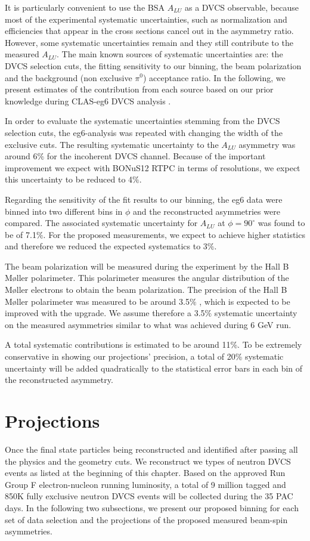 It is particularly convenient to use the BSA $A_{LU}$ as a DVCS observable, 
because most of the experimental systematic uncertainties, such as 
normalization and efficiencies that appear in the cross sections cancel out in 
the asymmetry ratio. However, some systematic uncertainties remain and they 
still contribute to the measured $A_{LU}$. The main known sources of systematic 
uncertainties are: the DVCS selection cuts, the fitting sensitivity to our 
binning, the beam polarization and the background (non exclusive $\pi^0$) 
acceptance ratio. In the following, we present estimates of the contribution 
from each source based on our prior knowledge during CLAS-eg6 DVCS analysis 
\cite{eg6_note}.

In order to evaluate the systematic uncertainties stemming from the DVCS 
selection cuts, the eg6-analysis was repeated with changing the width of the 
exclusive cuts. The resulting systematic uncertainty to the $A_{LU}$ asymmetry
was around 6$\%$ for the incoherent DVCS channel. Because of the important 
improvement we expect with BONuS12 RTPC in terms of resolutions, we expect this 
uncertainty to be reduced to 4$\%$.

Regarding the sensitivity of the fit results to our binning, the eg6 data were 
binned into two different bins in $\phi$ and the reconstructed asymmetries were 
compared. The associated systematic uncertainty for $A_{LU}$ at $\phi = 90 
^{\circ}$ was found to be of 7.1$\%$. For the proposed measurements, we expect 
to achieve higher statistics and therefore we reduced the expected systematics 
to 3$\%$.
   
The beam polarization will be measured during the experiment by the Hall B 
M\o{}ller polarimeter. This polarimeter measures the angular distribution of 
the M\o{}ller electrons to obtain the beam polarization. The precision of the 
Hall B M\o{}ller polarimeter was measured to be around 3.5$\%$ 
\cite{PhysRevSTAB.7.042802}, which is expected to be improved with the upgrade.  
We assume therefore a 3.5$\%$ systematic uncertainty on the measured 
asymmetries similar to what was achieved during 6 GeV run.

A total systematic contributions is estimated to be around 11\%. To be 
extremely conservative in showing our projections' precision, a total of 20\% 
systematic uncertainty will be added quadratically to the statistical error 
bars in each bin of the reconstructed asymmetry.

\section{Projections}
Once the final state particles being reconstructed and identified after passing 
all the physics and the geometry cuts. We reconstruct we types of neutron DVCS 
events as listed at the beginning of this chapter. Based on the approved  Run 
Group F electron-nucleon running luminosity, a total of 9 million tagged and 
850K fully exclusive neutron DVCS events will be collected during the 35 PAC 
days. In the following two subsections, we present our proposed binning for 
each set of data selection and the projections of the proposed measured 
beam-spin asymmetries.  




